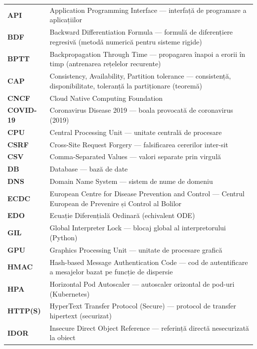 \begin{longtable}{@{}>{\bfseries}l@{\hspace{1cm}}p{11.3cm}@{}}
API        & Application Programming Interface --- interfață de programare a aplicațiilor \\
BDF        & Backward Differentiation Formula --- formulă de diferențiere regresivă (metodă numerică pentru sisteme rigide) \\
BPTT       & Backpropagation Through Time --- propagarea înapoi a erorii în timp (antrenarea rețelelor recurente) \\
CAP        & Consistency, Availability, Partition tolerance --- consistență, disponibilitate, toleranță la partiționare (teoremă) \\
CNCF       & Cloud Native Computing Foundation \\
COVID-19   & Coronavirus Disease 2019 --- boala provocată de coronavirus (2019) \\
CPU        & Central Processing Unit --- unitate centrală de procesare \\
CSRF       & Cross-Site Request Forgery --- falsificarea cererilor inter-sit \\
CSV        & Comma-Separated Values --- valori separate prin virgulă \\
DB         & Database --- bază de date \\
DNS        & Domain Name System --- sistem de nume de domeniu \\
ECDC       & European Centre for Disease Prevention and Control --- Centrul European de Prevenire și Control al Bolilor \\
EDO        & Ecuație Diferențială Ordinară (echivalent ODE) \\
GIL        & Global Interpreter Lock --- blocaj global al interpretorului (Python) \\
GPU        & Graphics Processing Unit --- unitate de procesare grafică \\
HMAC       & Hash-based Message Authentication Code --- cod de autentificare a mesajelor bazat pe funcție de dispersie \\
HPA        & Horizontal Pod Autoscaler --- autoscaler orizontal de pod-uri (Kubernetes) \\
HTTP(S)    & HyperText Transfer Protocol (Secure) --- protocol de transfer hipertext (securizat) \\
IDOR       & Insecure Direct Object Reference --- referință directă nesecurizată la obiect \\

\end{longtable}
